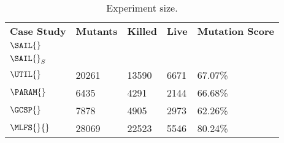 
\begin{table}[htb]
\caption{Experiment size.}
\label{table:results:accuracy:full} 
\scriptsize
\centering
\begin{tabular}{|p{15mm}|p{10mm}|p{7mm}|p{7mm}|p{10mm}|}
\hline
\textbf{Case Study}&\textbf{Mutants}&\textbf{Killed}&\textbf{Live}&\textbf{Mutation Score}\\ 
$\mathit{\SAIL{}}$ &  &  &  &\\
$\mathit{\SAIL{}}_{S}$ &  &  &  &\\
$\mathit{\UTIL{}}$ &20261 & 13590 & 6671 & 67.07\% \\
$\mathit{\PARAM{}}$&6435&4291&2144&66.68\%\\
$\mathit{\GCSP{}}$&7878&4905&2973&62.26\%\\
$\mathit{\MLFS{}{}}$&28069&22523&5546&80.24\%\\
\hline
\end{tabular}

\end{table}
